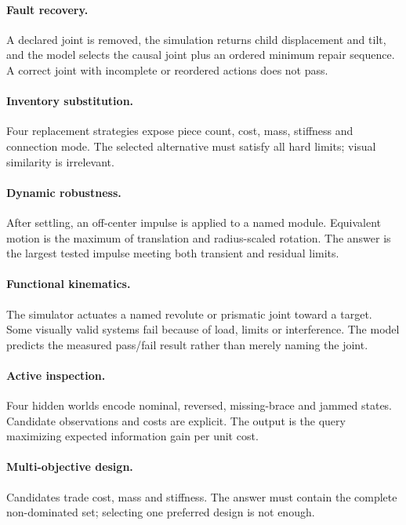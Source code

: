 \paragraph{Fault recovery.}
A declared joint is removed, the simulation returns child displacement
and tilt, and the model selects the causal joint plus an ordered minimum
repair sequence. A correct joint with incomplete or reordered actions
does not pass.

\paragraph{Inventory substitution.}
Four replacement strategies expose piece count, cost, mass, stiffness
and connection mode. The selected alternative must satisfy all hard
limits; visual similarity is irrelevant.

\paragraph{Dynamic robustness.}
After settling, an off-center impulse is applied to a named module.
Equivalent motion is the maximum of translation and radius-scaled
rotation. The answer is the largest tested impulse meeting both transient
and residual limits.

\paragraph{Functional kinematics.}
The simulator actuates a named revolute or prismatic joint toward a
target. Some visually valid systems fail because of load, limits or
interference. The model predicts the measured pass/fail result rather
than merely naming the joint.

\paragraph{Active inspection.}
Four hidden worlds encode nominal, reversed, missing-brace and jammed
states. Candidate observations and costs are explicit. The output is
the query maximizing expected information gain per unit cost.

\paragraph{Multi-objective design.}
Candidates trade cost, mass and stiffness. The answer must contain the
complete non-dominated set; selecting one preferred design is not enough.

